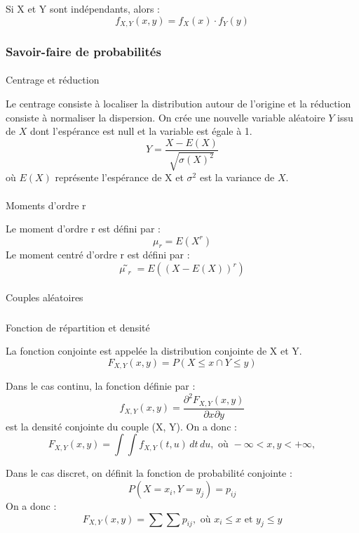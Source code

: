 \documentclass[
  letterpaper,
  DIV=11,
  numbers=noendperiod]{scrartcl}
\makeatletter
\let\oldparagraph\paragraph
\renewcommand{\paragraph}{
    \@ifstar
      \xxxParagraphStar
      \xxxParagraphNoStar
  }
\newcommand{\xxxParagraphStar}[1]{\oldparagraph*{#1}\mbox{}}
\newcommand{\xxxParagraphNoStar}[1]{\oldparagraph{#1}\mbox{}}
\let\oldsubparagraph\subparagraph
\renewcommand{\subparagraph}{
    \@ifstar
      \xxxSubParagraphStar
      \xxxSubParagraphNoStar
  }
\newcommand{\xxxSubParagraphStar}[1]{\oldsubparagraph*{#1}\mbox{}}
\newcommand{\xxxSubParagraphNoStar}[1]{\oldsubparagraph{#1}\mbox{}}
\makeatother
\begin{document}
Si X et Y sont indépendants, alors :
\[f_{X, Y}(x, y) = f_X(x) \cdot f_Y(y)\] \newpage

\subsubsection{Savoir-faire de
probabilités}\label{savoir-faire-de-probabilituxe9s}

\paragraph{Centrage et réduction}\label{centrage-et-ruxe9duction}

Le centrage consiste à localiser la distribution autour de l'origine et
la réduction consiste à normaliser la dispersion. On crée une nouvelle
variable aléatoire \(Y\) issu de \(X\) dont l'espérance est null et la
variable est égale à 1. \[Y = \frac{X - E(X)}{\sqrt{\sigma(X)^2}}\] où
\(E(X)\) représente l'espérance de X et \(\sigma^2\) est la variance de
\(X\).

\paragraph{Moments d'ordre r}\label{moments-dordre-r}

Le moment d'ordre r est défini par : \[\mu_r = E(X^r)\] Le moment centré
d'ordre r est défini par : \[\mũ_r = E((X - E(X))^r)\]

\paragraph{Couples aléatoires}\label{couples-aluxe9atoires}

\subparagraph{Fonction de répartition et
densité}\label{fonction-de-ruxe9partition-et-densituxe9}

La fonction conjointe est appelée la distribution conjointe de X et Y.
\[F_{X, Y}(x, y) = P(X \leqslant x \cap Y \leqslant y)\]

Dans le cas continu, la fonction définie par :
\[f_{X, Y}(x, y) = \frac{\partial^2 F_{X, Y}(x, y)}{\partial x \partial y}\]
est la densité conjointe du couple (X, Y). On a donc :
\[F_{X, Y}(x, y) = \int \int f_{X, Y}(t, u) \, dt \, du, \text{ où } -\infty < x, y < +\infty,\]

Dans le cas discret, on définit la fonction de probabilité conjointe :
\[P(X = x_i, Y = y_j) = p_{ij}\] On a donc :
\[F_{X, Y}(x, y) = \sum \sum p_{ij}, \text{ où } x_i \leqslant x \text{ et } y_j \leqslant y\]
\end{document}
